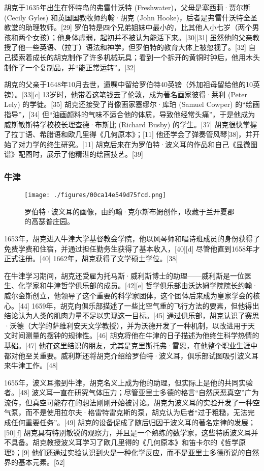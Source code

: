 胡克于1635年出生在怀特岛的弗雷什沃特 (Freshwater)，父母是塞西莉·贾尔斯 (Cecily Gyles) 和英国国教牧师约翰·胡克 (John Hooke)，后者是弗雷什沃特全圣教堂的助理牧师。[29] 罗伯特是四个兄弟姐妹中最小的，比其他人小七岁（两个男孩和两个女孩）；他身体虚弱，起初并不被认为能活下来。[30][31] 虽然他的父亲教授了他一些英语、（拉丁）语法和神学，但罗伯特的教育大体上被忽视了。[32] 自己摸索着成长的胡克制作了许多机械玩具；看到一个拆开的黄铜时钟后，他用木头制作了一个复制品，并“能正常运转”。[32]

胡克的父亲于1648年10月去世，遗嘱中留给罗伯特40英镑（外加祖母留给他的10英镑）。[33][c] 13岁时，他带着这笔钱去了伦敦，成为著名画家彼得·莱利 (Peter Lely) 的学徒。[35] 胡克还接受了肖像画家塞缪尔·库珀 (Samuel Cowper) 的“绘画指导”，[34] 但“油画颜料的气味不适合他的体质，导致他经常头痛”，于是他成为威斯敏斯特学校校长理查德·布斯比 (Richard Busby) 的学生。[37] 胡克很快掌握了拉丁语、希腊语和欧几里得《几何原本》；[11] 他还学会了弹奏管风琴[38]，并开始了对力学的终生研究。[11] 胡克后来在为罗伯特·波义耳的作品和自己《显微图谱》配图时，展示了他精湛的绘画技艺。[39]
\subsubsection{牛津}
\begin{figure}[ht]
\centering
\texttt{[image: ./figures/00ca14e549d75fcd.png]}
\caption{罗伯特·波义耳的画像，由约翰·克尔斯布姆创作，收藏于兰开夏郡的高瑟普庄园。} \label{fig_HK_1}
\end{figure}
1653年，胡克进入牛津大学基督教会学院，他以风琴师和唱诗班成员的身份获得了免费学费和住宿，并通过担任勤务生获得了基本收入，[40][d] 尽管他直到1658年才正式注册。[40] 1662年，胡克获得了文学硕士学位。[38]

在牛津学习期间，胡克还受雇为托马斯·威利斯博士的助理——威利斯是一位医生、化学家和牛津哲学俱乐部的成员。[42][e] 哲学俱乐部由沃达姆学院院长约翰·威尔金斯创立，他领导了这个重要的科学家团体，这个团体后来成为皇家学会的核心。[44] 1659年，胡克向俱乐部描述了一些比空气重的飞行方法的要素，但他得出结论认为人类的肌肉力量不足以实现这一目标。[45] 通过俱乐部，胡克认识了赛思·沃德（大学的萨维利安天文学教授），并为沃德开发了一种机制，以改进用于天文时间测量的摆钟的规律性。[46] 胡克将他在牛津的日子描述为他终生科学热情的基础。[47] 他在这里结识的朋友，尤其是克里斯托弗·雷恩，在他整个职业生涯中都对他至关重要。威利斯还将胡克介绍给罗伯特·波义耳，俱乐部试图吸引波义耳来牛津工作。[48]

1655年，波义耳搬到牛津，胡克名义上成为他的助理，但实际上是他的共同实验者。[48] 波义耳一直在研究气体压力；尽管亚里士多德的格言“自然厌恶真空”广为流传，但真空可能存在的想法刚刚开始被讨论。胡克为波义耳的实验开发了一种空气泵，而不是使用拉尔夫·格雷特雷克斯的泵，胡克认为后者“过于粗糙，无法完成任何重要任务”。[49] 胡克的设备促成了随后归因于波义耳的著名定律的发展；[50][f] 胡克具有特别敏锐的观察力，并且是一个熟练的数学家，这些特质波义耳并不具备。胡克教授波义耳学习了欧几里得的《几何原本》和笛卡尔的《哲学原理》；[9] 他们还通过实验认识到火是一种化学反应，而不是亚里士多德所说的自然界的基本元素。[52]
